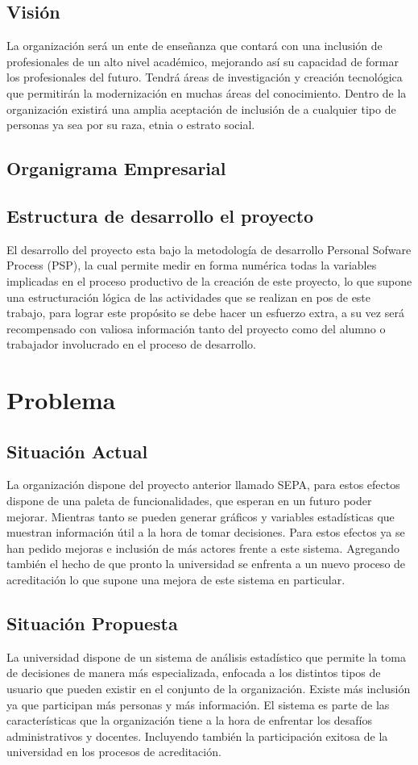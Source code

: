 \documentclass[a4paper,12pt,openany,oneside]{book}
\begin{document}
\section{Visión}
La organización será un ente de enseñanza que contará con una inclusión de profesionales de un alto nivel académico, mejorando así su capacidad de formar los profesionales del futuro. Tendrá áreas de investigación y creación tecnológica que permitirán la modernización en muchas áreas del conocimiento. Dentro de la organización existirá una amplia aceptación de inclusión de a cualquier tipo de personas ya sea por su raza, etnia o estrato social. 
\section{Organigrama Empresarial}

\section{Estructura de desarrollo el proyecto}
El desarrollo del proyecto esta bajo la metodología de desarrollo Personal Sofware Process (PSP), la cual permite medir en forma numérica todas la variables implicadas en el proceso productivo de la creación de este proyecto, lo que supone una estructuración lógica de las actividades que se realizan en pos de este trabajo, para lograr este propósito se debe hacer un esfuerzo extra, a su vez será recompensado con valiosa información tanto del proyecto como del alumno o trabajador involucrado en el proceso de desarrollo.
\chapter{Problema}
\thispagestyle{empty}
\section{Situación Actual}
La organización dispone del proyecto anterior llamado SEPA, para estos efectos dispone de una paleta de funcionalidades, que esperan en un futuro poder mejorar. Mientras tanto se pueden generar gráficos y variables estadísticas que muestran información útil a la hora de tomar decisiones. Para estos efectos ya se han pedido mejoras e inclusión de más actores frente a este sistema. Agregando también el hecho de que pronto la universidad se enfrenta a un nuevo proceso de acreditación lo que supone una mejora de este sistema en particular.
\section{Situación Propuesta}
La universidad dispone de un sistema de análisis estadístico que permite la toma de decisiones de manera más especializada, enfocada a los distintos tipos de usuario que pueden existir en el conjunto de la organización. Existe más inclusión ya que participan más personas y más información. El sistema  es parte de las características que la organización tiene a la hora de enfrentar los desafíos administrativos y docentes. Incluyendo también la participación exitosa de la universidad en los procesos de acreditación.
\end{document}

